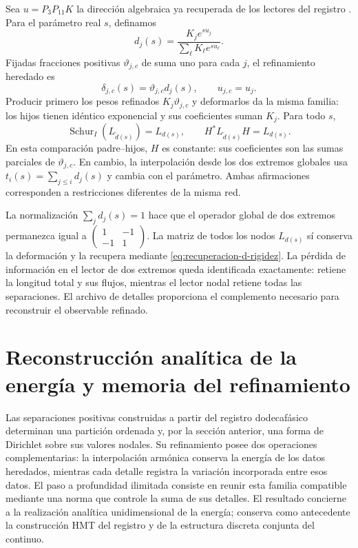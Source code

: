 \documentclass[a4paper,10pt]{article}
\theoremstyle{definition}\newtheorem{definition}[theorem]{Definición}
\theoremstyle{remark}\newtheorem{remark}[theorem]{Observación}
\numberwithin{equation}{section}
\begin{document}
Sea \(u=P_3P_{11}K\) la dirección algebraica ya recuperada de los
lectores del registro \cite{hmtX}. Para el parámetro real \(s\), definamos
\[
 d_j(s)=\frac{K_je^{su_j}}{\sum_\ell K_\ell e^{su_\ell}}.
\]
Fijadas fracciones positivas \(\vartheta_{j,c}\) de suma uno para cada
\(j\), el refinamiento heredado es
\[
 \delta_{j,c}(s)=\vartheta_{j,c}d_j(s),\qquad
 u_{j,c}=u_j.
\]
Producir primero los pesos refinados \(K_j\vartheta_{j,c}\) y
deformarlos da la misma familia: los hijos tienen idéntico exponencial y
sus coeficientes suman \(K_j\). Para todo \(s\),
\begin{equation}
 \operatorname{Schur}_{I}(L_{\widetilde d(s)})=L_{d(s)},
 \qquad H^*L_{\widetilde d(s)}H=L_{d(s)}.
 \label{eq:schur-flujo-k}
\end{equation}
En esta comparación padre--hijos, \(H\) es constante: sus coeficientes
son las sumas parciales de \(\vartheta_{j,c}\). En cambio, la
interpolación desde los dos extremos globales usa
\(t_i(s)=\sum_{j\le i}d_j(s)\) y cambia con el parámetro. Ambas
afirmaciones corresponden a restricciones diferentes de la misma red.

La normalización \(\sum_jd_j(s)=1\) hace que el operador global de dos
extremos permanezca igual a
\(\left(\begin{smallmatrix}1&-1\\-1&1\end{smallmatrix}\right)\).
La matriz de todos los nodos \(L_{d(s)}\) sí conserva la deformación y
la recupera mediante \eqref{eq:recuperacion-d-rigidez}. La pérdida de
información en el lector de dos extremos queda identificada exactamente:
retiene la longitud total y sus flujos, mientras el lector nodal retiene
todas las separaciones. El archivo de detalles proporciona el complemento
necesario para reconstruir el observable refinado.

\section{Reconstrucción analítica de la energía y memoria del refinamiento}
\label{sec:limite-energetico-k}

Las separaciones positivas construidas a partir del registro dodecafásico
determinan una partición ordenada y, por la sección anterior, una forma
de Dirichlet sobre sus valores nodales. Su refinamiento posee dos
operaciones complementarias: la interpolación armónica conserva la energía
de los datos heredados, mientras cada detalle registra la variación
incorporada entre esos datos. El paso a profundidad ilimitada consiste en
reunir esta familia compatible mediante una norma que controle la suma de
sus detalles. El resultado concierne a la realización analítica
unidimensional de la energía; conserva como antecedente la construcción
HMT del registro y de la estructura discreta conjunta del continuo.
\end{document}
